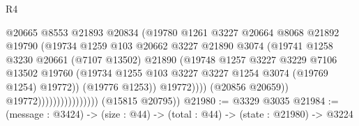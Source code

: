 \begin{lexlean}{R4}
\begin{coremodule}
                                            @20665
                                            @8553
                                            @21893
                                            @20834
                                            (@19780
                                              @1261
                                              @3227
                                              @20664
                                              @8068
                                              @21892
                                              @19790
                                              (@19734
                                                @1259
                                                @103
                                                @20662
                                                @3227
                                                @21890
                                                @3074
                                                (@19741
                                                  @1258
                                                  @3230
                                                  @20661
                                                  (@7107 @13502)
                                                  @21890
                                                  (@19748
                                                    @1257
                                                    @3227
                                                    @3229
                                                    @7106
                                                    @13502
                                                    @19760
                                                    (@19734
                                                      @1255
                                                      @103
                                                      @3227
                                                      @3227
                                                      @1254
                                                      @3074
                                                      (@19769 @1254)
                                                      @19772))
                                                  (@19776 @1253))
                                                @19772))))
                                        (@20856 @20659))
                                      @19772))))))))))))))))
      (@15815 @20795))
@21980 := @3329 @3035
@21984 := (message : @3424) -> (size : @44) -> (total : @44) -> (state : @21980) -> @3224

\end{coremodule}
\end{lexlean}
